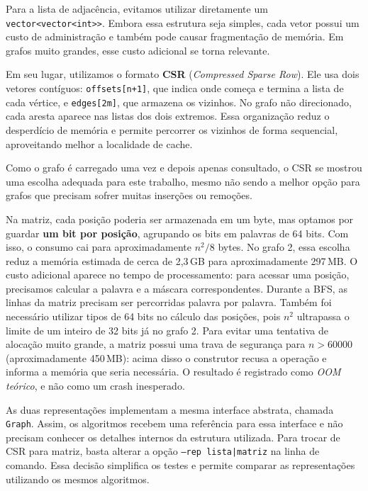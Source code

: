 \documentclass[11pt,a4paper]{article}
\begin{document}
Para a lista de adjac\^encia, evitamos utilizar diretamente um
\texttt{vector<vector<int>>}. Embora essa estrutura seja simples, cada vetor possui um
custo de administra\c c\~ao e tamb\'em pode causar fragmenta\c c\~ao de mem\'oria. Em
grafos muito grandes, esse custo adicional se torna relevante.

Em seu lugar, utilizamos o formato \textbf{CSR} (\textit{Compressed Sparse Row}). Ele
usa dois vetores cont\'iguos: \texttt{offsets[n+1]}, que indica onde come\c ca e termina
a lista de cada v\'ertice, e \texttt{edges[2m]}, que armazena os vizinhos. No grafo n\~ao
direcionado, cada aresta aparece nas listas dos dois extremos. Essa organiza\c c\~ao
reduz o desperd\'icio de mem\'oria e permite percorrer os vizinhos de forma sequencial,
aproveitando melhor a localidade de cache.

Como o grafo \'e carregado uma vez e depois apenas consultado, o CSR se mostrou uma
escolha adequada para este trabalho, mesmo n\~ao sendo a melhor op\c c\~ao para grafos
que precisam sofrer muitas inser\c c\~oes ou remo\c c\~oes.

Na matriz, cada posi\c c\~ao poderia ser armazenada em um byte, mas optamos por guardar
\textbf{um bit por posi\c c\~ao}, agrupando os bits em palavras de 64 bits. Com isso, o
consumo cai para aproximadamente $n^2/8$ bytes. No grafo 2, essa escolha reduz a
mem\'oria estimada de cerca de 2,3\,GB para aproximadamente 297\,MB. O custo
adicional aparece no tempo de processamento: para acessar uma posi\c c\~ao,
precisamos calcular a palavra e a m\'ascara correspondentes. Durante a BFS, as linhas
da matriz precisam ser percorridas palavra por palavra. Tamb\'em foi necess\'ario utilizar
tipos de 64 bits no c\'alculo das posi\c c\~oes, pois $n^2$ ultrapassa o limite de um
inteiro de 32 bits j\'a no grafo 2. Para evitar uma tentativa de aloca\c c\~ao muito
grande, a matriz possui uma trava de seguran\c ca para $n>60000$ (aproximadamente
450\,MB): acima disso o construtor recusa a opera\c c\~ao e informa a mem\'oria que seria
necess\'aria. O resultado \'e registrado como \textit{OOM te\'orico}, e n\~ao como um
crash inesperado.

As duas representa\c c\~oes implementam a mesma interface abstrata, chamada
\texttt{Graph}. Assim, os algoritmos recebem uma refer\^encia para essa interface e n\~ao
precisam conhecer os detalhes internos da estrutura utilizada. Para trocar de CSR para
matriz, basta alterar a op\c c\~ao \texttt{--rep lista|matriz} na linha de comando.
Essa decis\~ao simplifica os testes e permite comparar as representa\c c\~oes utilizando
os mesmos algoritmos.
\end{document}
